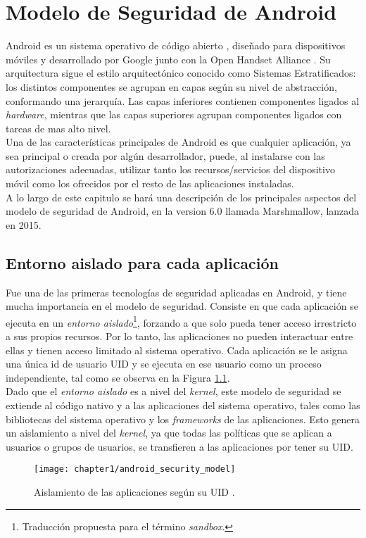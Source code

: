 \chapter{Modelo de Seguridad de Android}
Android \cite{aos} es un sistema operativo de código abierto \cite{aosp}, diseñado para dispositivos móviles y
desarrollado por Google junto con la Open Handset Alliance \cite{oha}. Su arquitectura sigue el estilo arquitectónico conocido como Sistemas Estratificados: los distintos componentes se agrupan en capas según su nivel de abstracción, conformando una jerarquía. Las capas inferiores contienen componentes ligados al \textit{hardware}, mientras que las capas superiores agrupan componentes ligados con tareas de mas alto nivel.\\
Una de las características principales de Android es que cualquier aplicación, ya sea principal o
creada por algún desarrollador, puede, al instalarse con las autorizaciones adecuadas, utilizar tanto
los recursos/servicios del dispositivo móvil como los ofrecidos por el resto de las aplicaciones
instaladas.\\
A lo largo de este capitulo se hará una descripción de los principales aspectos del modelo de seguridad de Android,  en la version 6.0 llamada Marshmallow, lanzada en 2015.
\section{Entorno aislado para cada aplicación}\label{ch01-sandbox}
Fue una de las primeras tecnologías de seguridad aplicadas en Android, y tiene mucha importancia en el modelo de seguridad. Consiste en que cada aplicación se ejecuta en un \emph{entorno aislado}\footnote{Traducción propuesta para el término \textit{sandbox}.}, forzando a que solo pueda tener acceso irrestricto a sus propios recursos. Por lo tanto, las aplicaciones no pueden interactuar entre ellas y tienen acceso limitado al sistema operativo. Cada aplicación se le asigna una única id de usuario UID y se ejecuta en ese usuario como un proceso independiente, tal como se observa en la Figura \ref{fig:ch01:sandbox}.\\
Dado que el \emph{entorno aislado} es a nivel del \textit{kernel}, este modelo de seguridad se extiende al código nativo y a las aplicaciones del sistema operativo, tales como las bibliotecas del sistema operativo y los \textit{frameworks} de las aplicaciones. Esto genera un aislamiento a nivel del \textit{kernel}, ya que todas las políticas que se aplican a usuarios o grupos de usuarios, se transfieren a las aplicaciones por tener su UID.
\begin{figure}[hbtp]
	\begin{center}
		\texttt{[image: chapter1/android\_security\_model]}
	    \caption{Aislamiento de las aplicaciones según su UID \cite{asreview2015}.}
	    \label{fig:ch01:sandbox}
    \end{center}
\end{figure}

